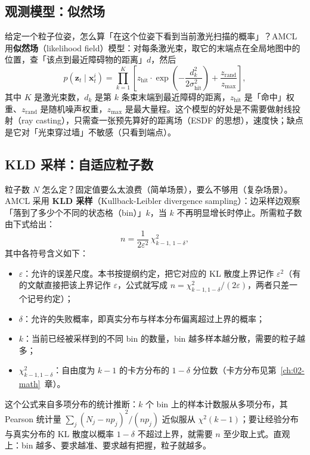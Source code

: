 \subsection{观测模型：似然场}

给定一个粒子位姿，怎么算「在这个位姿下看到当前激光扫描的概率」？AMCL 用\textbf{似然场}（likelihood field）模型：对每条激光束，取它的末端点在全局地图中的位置，查「该点到最近障碍物的距离」$d$，然后
\begin{equation}
  p\left(\bm{z}_t\mid\bm{x}_t^{i}\right) = \prod_{k=1}^{K}\left[
  z_{\text{hit}}\cdot\exp\left(-\frac{d_k^{2}}{2\sigma_{\text{hit}}^{2}}\right)
  + \frac{z_{\text{rand}}}{z_{\max}}\right],
  \label{eq:10-likelihood-field}
\end{equation}
其中 $K$ 是激光束数，$d_k$ 是第 $k$ 条束末端到最近障碍的距离，$z_{\text{hit}}$ 是「命中」权重、$z_{\text{rand}}$ 是随机噪声权重，$z_{\max}$ 是最大量程。这个模型的好处是不需要做射线投射（ray casting），只需查一张预先算好的距离场（ESDF 的思想），速度快；缺点是它对「光束穿过墙」不敏感（只看到端点）。

\subsection{KLD 采样：自适应粒子数}

粒子数 $N$ 怎么定？固定值要么太浪费（简单场景），要么不够用（复杂场景）。AMCL 采用 \textbf{KLD 采样}（Kullback-Leibler divergence sampling）：边采样边观察「落到了多少个不同的状态格（bin）」$k$，当 $k$ 不再明显增长时停止。所需粒子数由下式给出：
\begin{equation}
  n = \frac{1}{2\varepsilon^{2}}\,\chi^{2}_{k-1,\,1-\delta},
  \label{eq:10-kld}
\end{equation}
其中各符号含义如下：
\begin{itemize}
  \item $\varepsilon$：允许的误差尺度。本书按提纲约定，把它对应的 KL 散度上界记作 $\varepsilon^{2}$（有的文献直接把该上界记作 $\varepsilon$，公式就写成 $n=\chi^{2}_{k-1,1-\delta}/(2\varepsilon)$，两者只差一个记号约定）；
  \item $\delta$：允许的失败概率，即真实分布与样本分布偏离超过上界的概率；
  \item $k$：当前已经被采样到的不同 bin 的数量，bin 越多样本越分散，需要的粒子越多；
  \item $\chi^{2}_{k-1,1-\delta}$：自由度为 $k-1$ 的卡方分布的 $1-\delta$ 分位数（卡方分布见第~\ref{ch:02-math}~章）。
\end{itemize}
这个公式来自多项分布的统计推断：$k$ 个 bin 上的样本计数服从多项分布，其 Pearson 统计量 $\sum_j(N_j-np_j)^{2}/(np_j)$ 近似服从 $\chi^{2}(k-1)$；要让经验分布与真实分布的 KL 散度以概率 $1-\delta$ 不超过上界，就需要 $n$ 至少取上式。直观上：bin 越多、要求越准、要求越有把握，粒子就越多。

